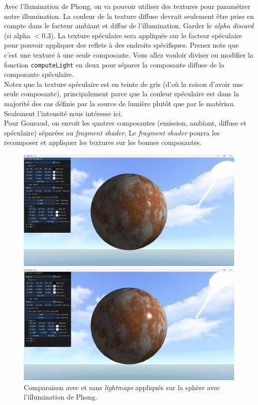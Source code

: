 \documentclass{article}[letterpaper, 11pt]
\begin{document}
Avec l'llumination de Phong, on va pouvoir utiliser des textures pour paramétrer notre illumination.
La couleur de la texture diffuse devrait seulement être prise en compte dans le facteur ambiant et diffus de l'illumination. Garder le \textit{alpha discard} (si alpha $< 0.3$).
La texture spéculaire sera appliquée sur le facteur spéculaire pour pouvoir appliquer des reflets à des endroits spécifiques.
Prenez note que c'est une texture à une seule composante. Vous allez vouloir diviser ou modifier la fonction \texttt{computeLight} en deux pour séparer la composante diffuse de la composante spéculaire.\vspace*{11pt}
\\
Notez que la texture spéculaire est en teinte de gris (d'où la raison d'avoir une seule composante), principalement parce que la couleur spéculaire est dans la majorité des cas définie par la source de lumière plutôt que par le matériau. Seulement l'intensité nous intéresse ici.\vspace*{11pt}
\\
Pour Gouraud, on envoit les quatres composantes (emission, ambiant, diffuse et spéculaire) séparées au \textit{fragment shader}.
Le \textit{fragment shader} pourra les recomposer et appliquer les textures sur les bonnes composantes.
\begin{figure}[h]
	\begin{minipage}[c]{.49\linewidth}
		 \centering
		 \includegraphics[scale = 0.125]{image_15.png}
	\end{minipage}
	\begin{minipage}[c]{.49\linewidth}
		 \centering
		 \includegraphics[scale = 0.125]{image_16.png}
	\end{minipage}
		 \caption{ \centering Comparaison avec et sans \textit{lightmaps} appliqués sur la sphère avec l'illumination de Phong.}
\end{figure}
\end{document}
